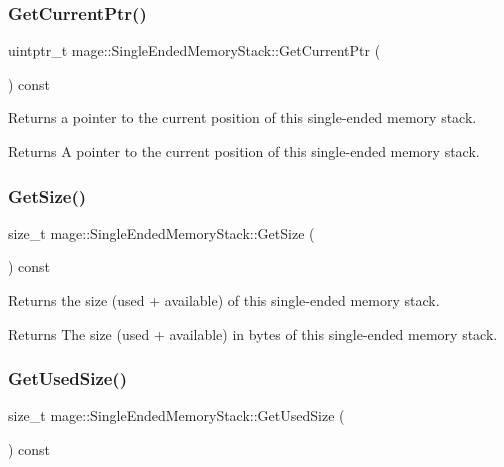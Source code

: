 \subsubsection{\texorpdfstring{Get\+Current\+Ptr()}{GetCurrentPtr()}}
{\footnotesize\ttfamily uintptr\+\_\+t mage\+::\+Single\+Ended\+Memory\+Stack\+::\+Get\+Current\+Ptr (\begin{DoxyParamCaption}{ }\end{DoxyParamCaption}) const\hspace{0.3cm}{\ttfamily [noexcept]}}

Returns a pointer to the current position of this single-\/ended memory stack.

\begin{DoxyReturn}{Returns}
A pointer to the current position of this single-\/ended memory stack. 
\end{DoxyReturn}
\mbox{\label{classmage_1_1_single_ended_memory_stack_aa1df0adf194d6c2bb6c7597a96c10e61}} 
\subsubsection{\texorpdfstring{Get\+Size()}{GetSize()}}
{\footnotesize\ttfamily size\+\_\+t mage\+::\+Single\+Ended\+Memory\+Stack\+::\+Get\+Size (\begin{DoxyParamCaption}{ }\end{DoxyParamCaption}) const\hspace{0.3cm}{\ttfamily [noexcept]}}

Returns the size (used + available) of this single-\/ended memory stack.

\begin{DoxyReturn}{Returns}
The size (used + available) in bytes of this single-\/ended memory stack. 
\end{DoxyReturn}
\mbox{\label{classmage_1_1_single_ended_memory_stack_ab2b07a4cf2c9eb9988ad49174e0804ac}} 
\subsubsection{\texorpdfstring{Get\+Used\+Size()}{GetUsedSize()}}
{\footnotesize\ttfamily size\+\_\+t mage\+::\+Single\+Ended\+Memory\+Stack\+::\+Get\+Used\+Size (\begin{DoxyParamCaption}{ }\end{DoxyParamCaption}) const\hspace{0.3cm}{\ttfamily [noexcept]}}

